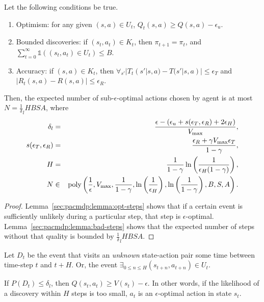 \begin{thm}
Let the following conditions be true.
\begin{enumerate}
\item
\label{sec:pacmdp:cond:opt}
Optimism: for any given $(s,a) \in U_t$, $Q_t(s,a) \geq Q(s,a) - \epsilon_u$.
\item
\label{sec:pacmdp:cond:bounded}
Bounded discoveries: if $(s_t, a_t) \in K_t$, then $\pi_{t+1} = \pi_{t}$, and $\sum_{t=0}^\infty \mathbb{1}\left((s_t,a_t) \in U_t\right) \leq B$.
\item
\label{sec:pacmdp:cond:acc}
Accuracy: if $(s,a) \in K_t$, then $\forall_{s'}|T_t(s'|s,a)-T(s'|s,a)| \leq \epsilon_T$ and $|R_t(s,a)-R(s,a)|\leq\epsilon_R$.
\end{enumerate}
Then, the expected number of sub-$\epsilon$-optimal actions chosen by agent \A is at most $N = \frac 1 \delta_l H B S A$, where
\begin{eqnarray}
\delta_l &=& \frac {\epsilon - (\epsilon_u + s(\epsilon_T,\epsilon_R) +2 \epsilon_H)} {V_{\rm max}},\\
s(\epsilon_T,\epsilon_R) &=& \frac {\epsilon_R + \gamma V_{\rm max} \epsilon_T} {1-\gamma},\\
H&=&\frac 1 {1-\gamma} \ln\left(\frac 1 {\epsilon_H (1-\gamma)}\right),\\
N&\in&\mbox{poly}\left(\frac 1 \epsilon, V_{\rm max}, \frac{1}{1-\gamma}, \ln\left(\frac 1 {\epsilon_H}\right), \ln \left(\frac{1}{1-\gamma}\right), B, S, A\right).
\end{eqnarray}
\end{thm}

\begin{proof}
Lemma~\ref{sec:pacmdp:lemma:opt-steps} shows that if a certain event is sufficiently unlikely during a particular step, that step is $\epsilon$-optimal. Lemma~\ref{sec:pacmdp:lemma:bad-steps} shows that the expected number of steps without that quality is bounded by $\frac 1 \delta_l H B S A$.
\end{proof}

\begin{defn}
Let $D_t$ be the event that \A visits an \emph{unknown} state-action pair some time between time-step $t$ and $t+H$. Or, the event $\exists_{0\leq n\leq H} (s_{t+n},a_{t+n}) \in U_t$.
\end{defn}

\begin{lemma}
\label{sec:pacmdp:lemma:opt-steps}
If $P(D_t) \leq \delta_l$, then $Q(s_t,a_t) \geq V(s_t) - \epsilon$. In other words, if the likelihood of a discovery within $H$ steps is too small, $a_t$ is an $\epsilon$-optimal action in state $s_t$.
\end{lemma}

